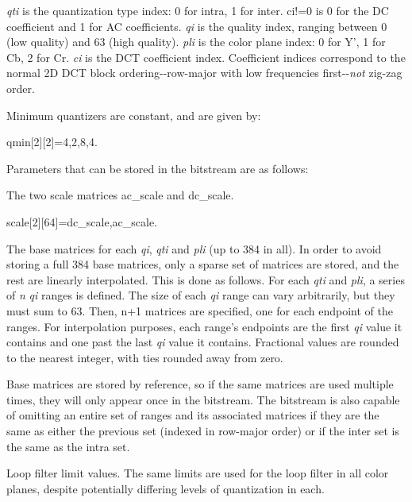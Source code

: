 {\itshape qti\/} is the quantization type index\-: 0 for intra, 1 for inter. {\ttfamily ci!=0} is 0 for the \-D\-C coefficient and 1 for \-A\-C coefficients. {\itshape qi\/} is the quality index, ranging between 0 (low quality) and 63 (high quality). {\itshape pli\/} is the color plane index\-: 0 for \-Y', 1 for \-Cb, 2 for \-Cr. {\itshape ci\/} is the \-D\-C\-T coefficient index. \-Coefficient indices correspond to the normal 2\-D \-D\-C\-T block ordering-\/-\/row-\/major with low frequencies first-\/-\/{\itshape not\/} zig-\/zag order.

\-Minimum quantizers are constant, and are given by\-: 
\begin{DoxyCode}
   qmin[2][2]={{4,2},{8,4}}.
\end{DoxyCode}


\-Parameters that can be stored in the bitstream are as follows\-:
\begin{DoxyItemize}
\item \-The two scale matrices ac\-\_\-scale and dc\-\_\-scale. 
\begin{DoxyCode}
      scale[2][64]={dc_scale,ac_scale}.
\end{DoxyCode}

\item \-The base matrices for each {\itshape qi\/}, {\itshape qti\/} and {\itshape pli\/} (up to 384 in all). \-In order to avoid storing a full 384 base matrices, only a sparse set of matrices are stored, and the rest are linearly interpolated. \-This is done as follows. \-For each {\itshape qti\/} and {\itshape pli\/}, a series of {\itshape n\/} {\itshape qi\/} ranges is defined. \-The size of each {\itshape qi\/} range can vary arbitrarily, but they must sum to 63. \-Then, {\ttfamily n+1} matrices are specified, one for each endpoint of the ranges. \-For interpolation purposes, each range's endpoints are the first {\itshape qi\/} value it contains and one past the last {\itshape qi\/} value it contains. \-Fractional values are rounded to the nearest integer, with ties rounded away from zero.
\end{DoxyItemize}

\-Base matrices are stored by reference, so if the same matrices are used multiple times, they will only appear once in the bitstream. \-The bitstream is also capable of omitting an entire set of ranges and its associated matrices if they are the same as either the previous set (indexed in row-\/major order) or if the inter set is the same as the intra set.


\begin{DoxyItemize}
\item \-Loop filter limit values. \-The same limits are used for the loop filter in all color planes, despite potentially differing levels of quantization in each.
\end{DoxyItemize}

